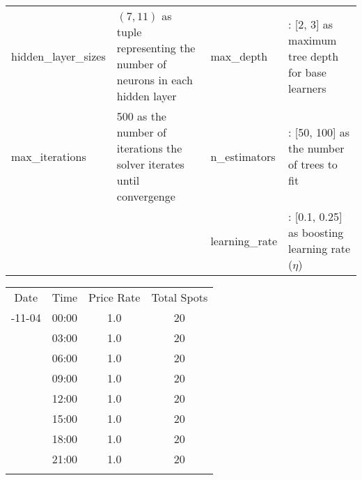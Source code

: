 \documentclass{ws-ijait}
\begin{document}
\begin{table}
{\begin{tabular}{lp{4cm}lp{4cm}}
				hidden\_layer\_sizes & $(7, 11)$ as tuple representing the number of neurons in each hidden layer & max\_depth & : [2, 3] as maximum tree depth for base learners \\
				
				max\_iterations & 500 as the number of iterations the solver iterates until convergenge & n\_estimators & : [50, 100] as the number of trees to fit\\
				
				& & learning\_rate & : [0.1, 0.25] as boosting learning rate ($\eta$)
				
				\botrule
		\end{tabular}}
		\label{tab:ml_params}
	\end{table}
	
	\begin{table}
		{\begin{tabular}{cccc}	
				\toprule
				Date & Time & Price Rate & Total Spots \\
				\colrule
				2017-11-04 & 	00:00 & 1.0 & 20 \\
							& 	03:00 & 1.0 & 20 \\
							& 	06:00 & 1.0 & 20 \\
							& 	09:00 & 1.0 & 20 \\
							& 	12:00 & 1.0 & 20 \\
							& 	15:00 & 1.0 & 20 \\
							& 	18:00 & 1.0 & 20 \\
							& 	21:00 & 1.0 & 20 \\
				\botrule
		\end{tabular}}
		\label{tab:ml_cwout}
	\end{table}		
	
	
\end{document}
